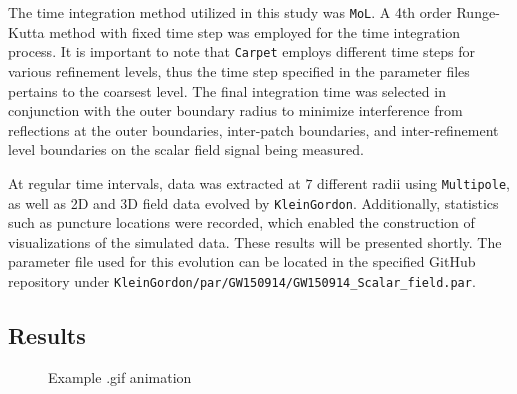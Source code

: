 The time integration method utilized in this study was \texttt{MoL}. A 4th order Runge-Kutta method with fixed time step was employed for the time integration process. It is important to note that \texttt{Carpet} employs different time steps for various refinement levels, thus the time step specified in the parameter files pertains to the coarsest level. The final integration time was selected in conjunction with the outer boundary radius to minimize interference from reflections at the outer boundaries, inter-patch boundaries, and inter-refinement level boundaries on the scalar field signal being measured.

At regular time intervals, data was extracted at $7$ different radii using \texttt{Multipole}, as well as 2D and 3D field data evolved by \texttt{KleinGordon}. Additionally, statistics such as puncture locations were recorded, which enabled the construction of visualizations of the simulated data. These results will be presented shortly. The parameter file used for this evolution can be located in the specified GitHub repository under \texttt{KleinGordon/par/GW150914/GW150914\_Scalar\_field.par}.

\subsection{Results}

\begin{figure}
  \centering
  \caption{Example .gif animation}
\end{figure}